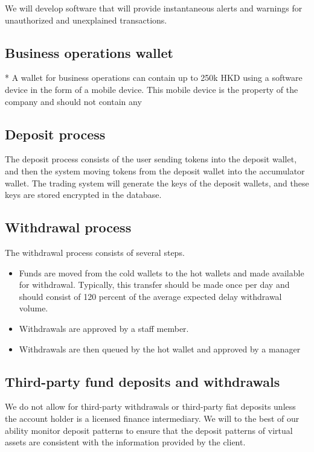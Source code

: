 We will develop software that will provide instantaneous alerts and
warnings for unauthorized and unexplained transactions.  

\subsection{Business operations wallet}

* A wallet for business operations can contain up to 250k HKD using a
software device in the form of a mobile device.  This mobile device is
the property of the company and should not contain any

\subsection{Deposit process}
The deposit process consists of the user sending tokens into the
deposit wallet, and then the system moving tokens from the deposit
wallet into the accumulator wallet.  The trading system will generate
the keys of the deposit wallets, and these keys are stored encrypted
in the database.

\subsection{Withdrawal process}
The withdrawal process consists of several steps.
\begin{itemize}
  \item Funds are moved from the cold wallets to the hot wallets and
    made available for withdrawal.  Typically, this transfer should be
    made once per day and should consist of 120 percent of the average
    expected delay withdrawal volume.
  \item Withdrawals are approved by a staff member.
  \item Withdrawals are then queued by the hot wallet and approved by a manager
\end{itemize}

\subsection{Third-party fund deposits and withdrawals}
We do not allow for third-party withdrawals or third-party fiat
deposits unless the account holder is a licensed finance intermediary.
We will to the best of our ability monitor deposit patterns to ensure
that the deposit patterns of virtual assets are consistent with the
information provided by the client.

